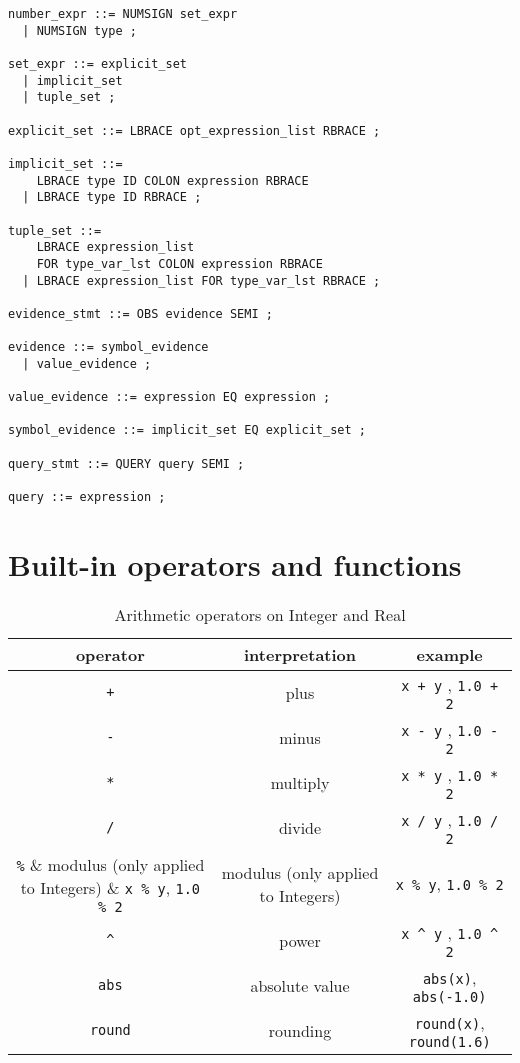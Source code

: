 \documentclass[12pt]{article}
\begin{document}
\begin{verbatim}
number_expr ::= NUMSIGN set_expr
  | NUMSIGN type ;

set_expr ::= explicit_set
  | implicit_set
  | tuple_set ;

explicit_set ::= LBRACE opt_expression_list RBRACE ;

implicit_set ::= 
    LBRACE type ID COLON expression RBRACE
  | LBRACE type ID RBRACE ;

tuple_set ::= 
    LBRACE expression_list 
    FOR type_var_lst COLON expression RBRACE
  | LBRACE expression_list FOR type_var_lst RBRACE ;

evidence_stmt ::= OBS evidence SEMI ;

evidence ::= symbol_evidence
  | value_evidence ;

value_evidence ::= expression EQ expression ;

symbol_evidence ::= implicit_set EQ explicit_set ;

query_stmt ::= QUERY query SEMI ;

query ::= expression ;
\end{verbatim}


\section{Built-in operators and functions}\label{builtin-operator-appendix}
\begin{table}[H]
\centering
\caption{Arithmetic operators on Integer and Real}
\begin{tabular}{ c c c }
\toprule 
operator & interpretation & example \\
\midrule
\verb|+| & plus & \verb|x + y| , \verb|1.0 + 2|\\ 
\verb|-| & minus & \verb|x - y| , \verb|1.0 - 2|\\ 
\verb|*| & multiply & \verb|x * y| , \verb|1.0 * 2|\\
\verb|/| & divide & \verb|x / y| , \verb|1.0 / 2|\\ 
\verb|%| & modulus (only applied to Integers) & \verb|x % y|, \verb|1.0 % 2| \\
\verb|^| & power & \verb|x ^ y| , \verb|1.0 ^ 2| \\
\verb|abs| & absolute value & \verb|abs(x)|,  \verb|abs(-1.0)| \\
\verb|round| & rounding & \verb|round(x)|,  \verb|round(1.6)| \\
\bottomrule
\end{tabular}
\end{table}
\end{document}
